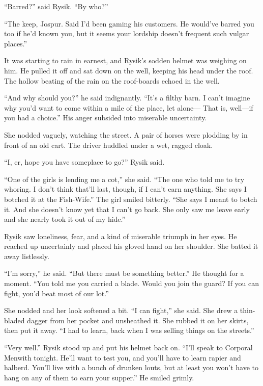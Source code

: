 \documentclass[10pt,a4paper]{article}
\begin{document}
``Barred?'' said Rysik. ``By who?''

``The keep, Jospur. Said I'd been gaming his customers. He would've
barred you too if he'd known you, but it seems your lordship doesn't
frequent such vulgar places.''

It was starting to rain in earnest, and Rysik's sodden helmet
was weighing on him. He pulled it off and sat down on the well,
keeping his head under the roof. The hollow beating of the rain on
the roof-boards echoed in the well.

``And why should you?'' he said indignantly. ``It's a filthy barn. I
can't imagine why you'd want to come within a mile of the place,
let alone--- That is, well---if you had a choice.'' His anger subsided
into miserable uncertainty.

She nodded vaguely, watching the street. A pair of horses were
plodding by in front of an old cart. The driver huddled under a wet,
ragged cloak.

``I, er, hope you have someplace to go?'' Rysik said.

``One of the girls is lending me a cot,'' she said. ``The one who
told me to try whoring. I don't think that'll last, though, if
I can't earn anything. She says I botched it at the Fish-Wife.''
The girl smiled bitterly. ``She says I meant to botch it. And she
doesn't know yet that I can't go back. She only saw me leave early
and she nearly took it out of my hide.''

Rysik saw loneliness, fear, and a kind of miserable triumph in her
eyes. He reached up uncertainly and placed his gloved hand on her
shoulder. She batted it away listlessly.

``I'm sorry,'' he said. ``But there must be something better.'' He
thought for a moment. ``You told me you carried a blade. Would you
join the guard? If you can fight, you'd beat most of our lot.''

She nodded and her look softened a bit. ``I can fight,'' she said.
She drew a thin-bladed dagger from her pocket and unsheathed it.
She rubbed it on her skirts, then put it away. ``I had to learn,
back when I was selling things on the streets.''

``Very well.'' Rysik stood up and put his helmet back on. ``I'll speak
to Corporal Menwith tonight. He'll want to test you, and you'll have
to learn rapier and halberd. You'll live with a bunch of drunken
louts, but at least you won't have to hang on any of them to earn
your supper.'' He smiled grimly.
\end{document}
